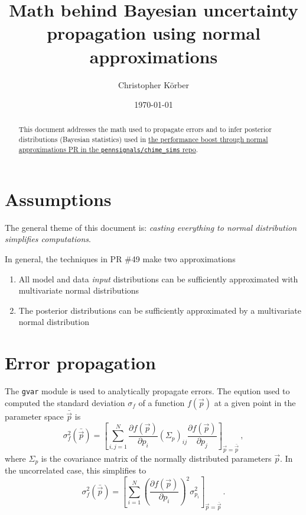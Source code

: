 \documentclass[paper=a4, fontsize=12pt, prl, notitlepage]{revtex4-1}
\begin{document}
\title{Math behind Bayesian uncertainty propagation using normal approximations}
\author{Christopher Körber}
\date{\today}
\begin{abstract}
This document addresses the math used to propagate errors and to infer posterior distributions (Bayesian statistics) used in \href{https://github.com/pennsignals/chime_sims/pull/49}{the performance boost through normal approximations PR in the \texttt{pennsignals/chime\_sims} repo}.
\end{abstract}

\maketitle


\section{Assumptions}
The general theme of this document is: \textit{casting everything to normal distribution simplifies computations}.

In general, the techniques in PR \#49 make two approximations
\begin{enumerate}
    \item All model and data \textit{input} distributions can be sufficiently approximated with multivariate normal distributions
    \item The posterior distributions can be sufficiently approximated by a multivariate normal distribution
\end{enumerate}

\section{Error propagation}
The \texttt{gvar} module is used to analytically propagate errors.
The eqution used to computed the standard deviation $\sigma_f$ of a function $f(\vec p)$ at a given point in the parameter space $\bar {\vec p}$ is
\begin{equation}
    \sigma_f^2(\bar {\vec p})
    =
    \left[
        \sum_{i,j=1}^N
        \frac{\partial f(\vec p)}{\partial p_i}
        \left(\Sigma_p\right)_{ij}
        \frac{\partial f(\vec p)}{\partial p_j}
    \right]_{\vec p = \bar {\vec p}}
    \, ,
\end{equation}
where $\Sigma_p$ is the covariance matrix of the normally distributed parameters $\vec p$.
In the uncorrelated case, this simplifies to
\begin{equation}
    \sigma_f^2(\bar {\vec p})
    =
    \left[
        \sum_{i=1}^N
        \left(\frac{\partial f(\vec p)}{\partial p_i}\right)^2
        \sigma_{p_i}^2
    \right]_{\vec p = \bar {\vec p}}
    \, .
\end{equation}
\end{document}
